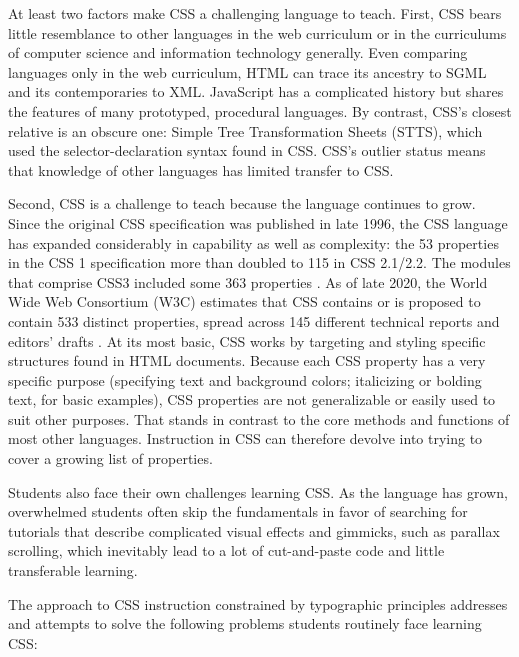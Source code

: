 \documentclass[sigplan,screen]{acmart}
\begin{document}
At least two factors make CSS a challenging language to teach. First, CSS bears little resemblance to other languages in the web curriculum or in the curriculums of computer science and information technology generally. Even comparing languages only in the web curriculum, HTML can trace its ancestry to SGML and its contemporaries to XML. JavaScript has a complicated history but shares the features of many prototyped, procedural languages. By contrast, CSS’s closest relative is an obscure one: Simple Tree Transformation Sheets (STTS)\cite{w3c:briefhistory}, which used the selector-declaration syntax found in CSS. CSS's outlier status means that knowledge of other languages has limited transfer to CSS.

Second, CSS is a challenge to teach because the language continues to grow. Since the original CSS specification was published in late 1996, the CSS language has expanded considerably in capability as well as complexity: the 53 properties in the CSS 1 specification more than doubled to 115 in CSS 2.1/2.2. The modules that comprise CSS3 included some 363 properties \cite{jom:css}. As of late 2020, the World Wide Web Consortium (W3C) estimates that CSS contains or is proposed to contain 533 distinct properties, spread across 145 different technical reports and editors' drafts \cite{w3c:iop}. At its most basic, CSS works by targeting and styling specific structures found in HTML documents. Because each CSS property has a very specific purpose (specifying text and background colors; italicizing or bolding text, for basic examples), CSS properties are not generalizable or easily used to suit other purposes. That stands in contrast to the core methods and functions of most other languages. Instruction in CSS can therefore devolve into trying to cover a growing list of properties.

 Students also face their own challenges learning CSS. As the language has grown, overwhelmed students often skip the fundamentals in favor of searching for tutorials that describe complicated visual effects and gimmicks, such as parallax scrolling, which inevitably lead to a lot of cut-and-paste code and little transferable learning.

The approach to CSS instruction constrained by typographic principles addresses and attempts to solve the following problems students routinely face learning CSS:
\end{document}
